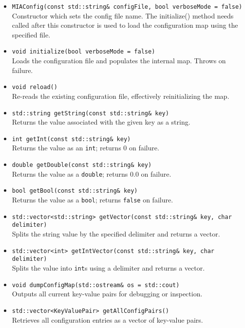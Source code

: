 \begin{itemize}
	\item \texttt{MIAConfig(const std::string\& configFile, bool verboseMode = false)}\\
	Constructor which sets the config file name. The initialize() method needs called after this constructor is used to load the configuration map using the specified file.
	
	\item \texttt{void initialize(bool verboseMode = false)}\\
	Loads the configuration file and populates the internal map. Throws on failure.
	
	\item \texttt{void reload()}\\
	Re-reads the existing configuration file, effectively reinitializing the map.
	
	\item \texttt{std::string getString(const std::string\& key)}\\
	Returns the value associated with the given key as a string.
	
	\item \texttt{int getInt(const std::string\& key)}\\
	Returns the value as an \texttt{int}; returns 0 on failure.
	
	\item \texttt{double getDouble(const std::string\& key)}\\
	Returns the value as a \texttt{double}; returns 0.0 on failure.
	
	\item \texttt{bool getBool(const std::string\& key)}\\
	Returns the value as a \texttt{bool}; returns \texttt{false} on failure.
	
	\item \texttt{std::vector<std::string> getVector(const std::string\& key, char delimiter)}\\
	Splits the string value by the specified delimiter and returns a vector.
	
	\item \texttt{std::vector<int> getIntVector(const std::string\& key, char delimiter)}\\
	Splits the value into \texttt{int}s using a delimiter and returns a vector.
	
	\item \texttt{void dumpConfigMap(std::ostream\& os = std::cout)}\\
	Outputs all current key-value pairs for debugging or inspection.
	
	\item \texttt{std::vector<KeyValuePair> getAllConfigPairs()}\\
	Retrieves all configuration entries as a vector of key-value pairs.
\end{itemize}

